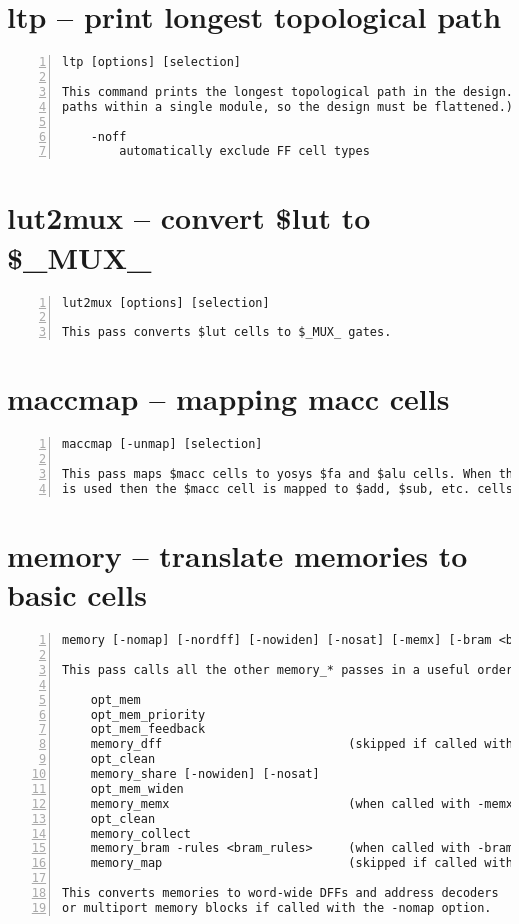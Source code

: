 \section{ltp -- print longest topological path}
\label{cmd:ltp}
\begin{lstlisting}[numbers=left,frame=single]
    ltp [options] [selection]

This command prints the longest topological path in the design. (Only considers
paths within a single module, so the design must be flattened.)

    -noff
        automatically exclude FF cell types
\end{lstlisting}

\section{lut2mux -- convert \$lut to \$\_MUX\_}
\label{cmd:lut2mux}
\begin{lstlisting}[numbers=left,frame=single]
    lut2mux [options] [selection]

This pass converts $lut cells to $_MUX_ gates.
\end{lstlisting}

\section{maccmap -- mapping macc cells}
\label{cmd:maccmap}
\begin{lstlisting}[numbers=left,frame=single]
    maccmap [-unmap] [selection]

This pass maps $macc cells to yosys $fa and $alu cells. When the -unmap option
is used then the $macc cell is mapped to $add, $sub, etc. cells instead.
\end{lstlisting}

\section{memory -- translate memories to basic cells}
\label{cmd:memory}
\begin{lstlisting}[numbers=left,frame=single]
    memory [-nomap] [-nordff] [-nowiden] [-nosat] [-memx] [-bram <bram_rules>] [selection]

This pass calls all the other memory_* passes in a useful order:

    opt_mem
    opt_mem_priority
    opt_mem_feedback
    memory_dff                          (skipped if called with -nordff or -memx)
    opt_clean
    memory_share [-nowiden] [-nosat]
    opt_mem_widen
    memory_memx                         (when called with -memx)
    opt_clean
    memory_collect
    memory_bram -rules <bram_rules>     (when called with -bram)
    memory_map                          (skipped if called with -nomap)

This converts memories to word-wide DFFs and address decoders
or multiport memory blocks if called with the -nomap option.
\end{lstlisting}

